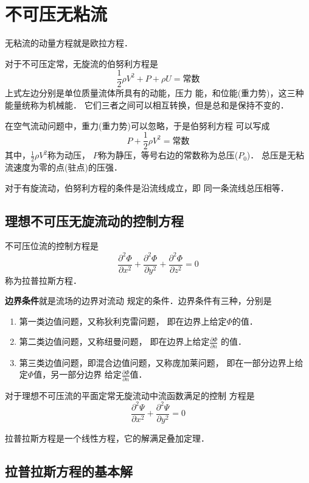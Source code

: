 
\chapter{不可压无粘流}
无粘流的动量方程就是欧拉方程．

对于不可压定常，无旋流的伯努利方程是
\[
  \frac{1}{2}\rho V^2+P +\rho U=
  \text{常数}
\]
上式左边分别是单位质量流体所具有的动能，压力
能，和位能(重力势)，这三种能量统称为机械能．
它们三者之间可以相互转换，但是总和是保持不变的．

\begin{notice}
  在空气流动问题中，重力(重力势)可以忽略，于是伯努利方程
  可以写成
  \[
    P+\frac{1}{2}\rho V^2=\text{常数}
  \]
  其中，$\frac{1}{2}\rho V^2$称为动压，
  $P$称为静压，等号右边的常数称为总压($P_0$)．
  总压是无粘流速度为零的点(驻点)的压强．
\end{notice}

对于有旋流动，伯努利方程的条件是沿流线成立，即
同一条流线总压相等．

\section{理想不可压无旋流动的控制方程}
不可压位流的控制方程是
\[
  \frac{\partial ^2 \Phi}{\partial x^2}+
  \frac{\partial ^2 \Phi}{\partial y^2}+
  \frac{\partial ^2 \Phi}{\partial z^2}=
  0
\]
称为拉普拉斯方程．

{\bfseries 边界条件}就是流场的边界对流动
规定的条件．边界条件有三种，分别是
\begin{enumerate}
  \item 第一类边值问题，又称狄利克雷问题，
        即在边界上给定$\Phi$的值．
  \item 第二类边值问题，又称纽曼问题，
        即在边界上给定$\frac{\partial \Phi}{\partial n }$
        的值．
  \item 第三类边值问题，即混合边值问题，又称庞加莱问题，
        即在一部分边界上给定$\Phi$值，另一部分边界
        给定$\frac{\partial \Phi}{\partial n }$值．
\end{enumerate}
对于理想不可压流的平面定常无旋流动中流函数满足的控制
方程是
\[
  \frac{\partial ^2 \Psi}{\partial x^2}+
  \frac{\partial ^2 \Psi }{\partial y^2}=
  0
\]
\begin{note}
  拉普拉斯方程是一个线性方程，它的解满足叠加定理．
\end{note}

\section{拉普拉斯方程的基本解}
